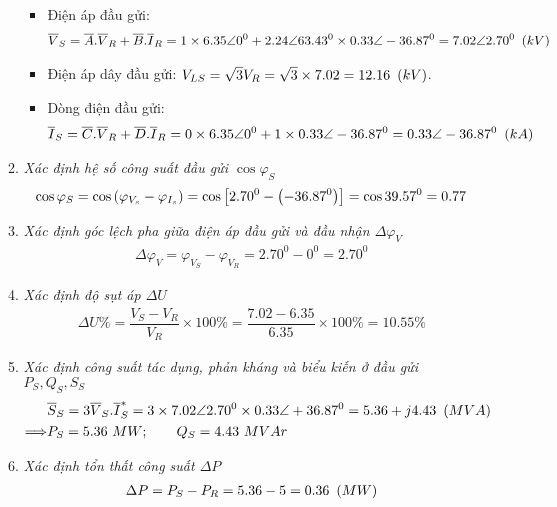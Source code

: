 \begin{enumerate}
\begin{enumerate}[\it a.]
\begin{itemize}
						\item Điện áp đầu gửi:
							\begin{align*}
								\overline{V}_S  = \overline{A}. \overline{V}_R + \overline{B}.\overline{I}_R = 1 \times 6.35 \angle 0^0 + 2.24 \angle 63.43^0 \times 0.33 \angle -36.87^0 = 7.02 \angle 2.70^0 ~\left({kV}\right)
								\end{align*}
								
						\item Điện áp dây đầu gửi: $V_{LS}  = \sqrt{3} V_R = \sqrt{3} \times 7.02 = 12.16 ~\left({kV}\right)$.
						\item Dòng điện đầu gửi:
							\begin{align*}								
								\overline{I}_S  = \overline{C}. \overline{V}_R + \overline{D}.\overline{I}_R = 0 \times 6.35 \angle 0^0 + 1 \times 0.33 \angle -36.87^0 = 0.33 \angle -36.87^0 ~\left({kA}\right)
							\end{align*}
					\end{itemize}

					\item \emph{Xác định hệ số công suất đầu gửi $\cos \varphi_S$}
						\begin{align*}
							\cos \varphi_S  = \cos \left({\varphi_{V_s} - \varphi_{I_{s}}}\right)= \cos \left[{2.70^0 - \left({-36.87^0}\right)} \right] = \cos 39.57^0 = 0.77
						\end{align*}
				
				\item \emph{Xác định góc lệch pha giữa điện áp đầu gửi và đầu nhận $\Delta \varphi_V$}
					\begin{align*}
						\Delta \varphi_V = \varphi_{V_S} - \varphi_{V_R} = 2.70^0 - 0^0 = 2.70^0
					\end{align*}
					
				\item \emph{Xác định độ sụt áp $\Delta U$}
					\begin{align*}
						\Delta U \%= \dfrac{V_S - V_R}{V_R} \times 100 \% = \dfrac{7.02 - 6.35}{6.35} \times 100 \% = 10.55\%
					\end{align*}
					
				\item \emph{Xác định công suất tác dụng, phản kháng và biểu kiến ở đầu gửi $P_S, Q_S, S_S$}
					\begin{align*}
						& \overline{S}_S  = 3 \overline{V}_S.\overline{I}_S^{\ast} = 3 \times 7.02 \angle 2.70^0 \times 0.33 \angle +36.87^0 = 5.36 + j4.43 ~\left({MVA}\right)\\
						\Longrightarrow & P_S  = 5.36 ~MW; \qquad Q_S = 4.43 ~MVAr
					\end{align*}
				\item \emph{Xác định tổn thất công suất $\Delta P$}
					\begin{align*}
						\Delta P = P_S - P_R = 5.36 - 5 = 0.36 ~\left({MW}\right)
					\end{align*}
				

\end{enumerate}
\end{enumerate}
